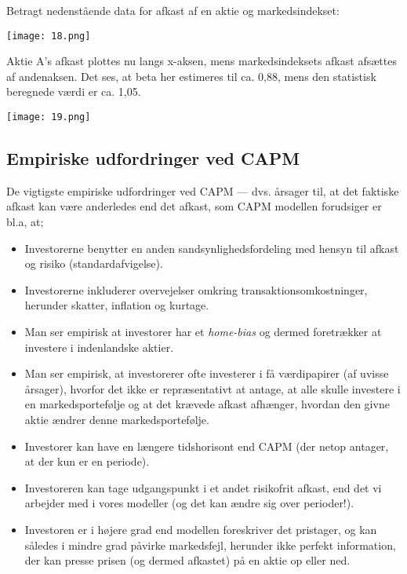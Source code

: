 \documentclass[10pt,reqno, usenames]{article}
\begin{document}
\begin{tcolorbox}[breakable, colback=red!5!white, colframe=red!50!black, title= Eksempel 8: Estimation af beta]
Betragt nedenstående data for afkast af en aktie og markedsindekset: 

\vspace{10 pt}
\begin{center}
        \texttt{[image: 18.png]}
\end{center}

Aktie A's afkast plottes nu langs x-aksen, mens markedsindeksets afkast afsættes af andenaksen. Det ses, at beta her estimeres til ca. 0,88, mens den statistisk beregnede værdi er ca. 1,05.

\vspace{10 pt}
\begin{center}
        \texttt{[image: 19.png]}
\end{center}
\end{tcolorbox}

\subsection{Empiriske udfordringer ved CAPM}
De vigtigste empiriske udfordringer ved CAPM — dvs. årsager til, at det faktiske afkast kan være anderledes end det afkast, som CAPM modellen forudsiger er bl.a, at; 

\begin{itemize}
    \item Investorerne benytter en anden sandsynlighedsfordeling med hensyn til afkast og risiko (standardafvigelse). 
    \item Investorerne inkluderer overvejelser omkring transaktionsomkostninger, herunder skatter, inflation og kurtage.
    \item Man ser empirisk at investorer har et \textit{home-bias} og dermed foretrækker at investere i indenlandske aktier. 
    \item Man ser empirisk, at investorerer ofte investerer i få værdipapirer (af uvisse årsager), hvorfor det ikke er repræsentativt at antage, at alle skulle investere i en markedsportefølje og at det krævede afkast afhænger, hvordan den givne aktie ændrer denne markedsportefølje. 
    \item Investorer kan have en længere tidshorisont end CAPM (der netop antager, at der kun er en periode). 
    \item Investoreren kan tage udgangspunkt i et andet risikofrit afkast, end det vi arbejder med i vores modeller (og det kan ændre sig over perioder!). 
    \item Investoren er i højere grad end modellen foreskriver det pristager, og kan således i mindre grad påvirke markedsfejl, herunder ikke perfekt information, der kan presse prisen (og dermed afkastet) på en aktie op eller ned.
\end{itemize}
\end{document}
